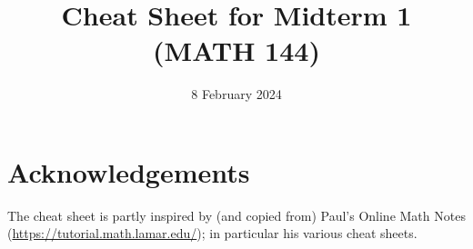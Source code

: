 \documentclass[9pt]{extarticle}
\title{Cheat Sheet for Midterm 1 (MATH 144)}
\date{8 February 2024}
\theoremstyle{definition}
\begin{document}
	
	
	

	\section{Acknowledgements}
	The cheat sheet is partly inspired by (and copied from) Paul's Online Math Notes (\url{https://tutorial.math.lamar.edu/}); in particular his various cheat sheets.
\end{document}
